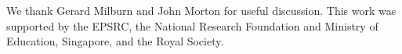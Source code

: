 
\begin{acknowledgements}
We thank Gerard Milburn and John Morton for useful discussion. This work was supported by the EPSRC, the National Research Foundation and Ministry of Education, Singapore, and the Royal Society.
\end{acknowledgements}



